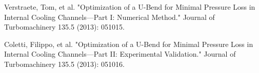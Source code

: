 \documentclass[a4paper,onecolumn]{article}
\theoremstyle{remark}
\begin{document}
\begin{thebibliography}{9}
%
%
%
%
%

%
Verstraete, Tom, et al. 
"Optimization of a U-Bend for Minimal Pressure Loss in Internal Cooling Channels—Part I: Numerical Method." 
Journal of Turbomachinery 135.5 (2013): 051015.

%
Coletti, Filippo, et al. 
"Optimization of a U-Bend for Minimal Pressure Loss in Internal Cooling Channels—Part II: Experimental Validation." 
Journal of Turbomachinery 135.5 (2013): 051016.

%
%
%


\end{thebibliography}
\end{document}
